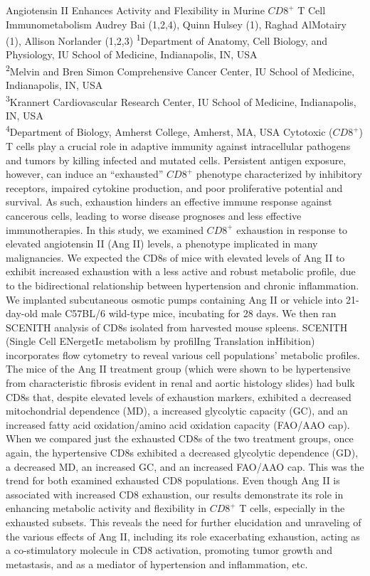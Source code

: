 \makeabstract
{
Angiotensin II Enhances Activity and Flexibility in Murine $CD8^+$ T Cell Immunometabolism
}
{
Audrey Bai (1,2,4), Quinn Hulsey (1), Raghad AlMotairy (1), Allison Norlander (1,2,3)
}
{
\textsuperscript{1}Department of Anatomy, Cell Biology, and Physiology, IU School of Medicine, Indianapolis, IN, USA\\
\textsuperscript{2}Melvin and Bren Simon Comprehensive Cancer Center, IU School of Medicine, Indianapolis, IN, USA\\
\textsuperscript{3}Krannert Cardiovascular Research Center, IU School of Medicine, Indianapolis, IN, USA\\
\textsuperscript{4}Department of Biology, Amherst College, Amherst, MA, USA
}
{
Cytotoxic ($CD8^+$) T cells play a crucial role in adaptive immunity against intracellular pathogens and tumors by killing infected and mutated cells. Persistent antigen exposure, however, can induce an “exhausted” $CD8^+$ phenotype characterized by inhibitory receptors, impaired cytokine production, and poor proliferative potential and survival. As such, exhaustion hinders an effective immune response against cancerous cells, leading to worse disease prognoses and less effective immunotherapies. In this study, we examined $CD8^+$ exhaustion in response to elevated angiotensin II (Ang II) levels, a phenotype implicated in many malignancies. We expected the CD8s of mice with elevated levels of Ang II to exhibit increased exhaustion with a less active and robust metabolic profile, due to the bidirectional relationship between hypertension and chronic inflammation.
}
{
We implanted subcutaneous osmotic pumps containing Ang II or vehicle into 21-day-old male C57BL/6 wild-type mice, incubating for 28 days. We then ran SCENITH analysis of CD8s isolated from harvested mouse spleens. SCENITH (Single Cell ENergetIc metabolism by profilIng Translation inHibition) incorporates flow cytometry to reveal various cell populations’ metabolic profiles.
}
{
The mice of the Ang II treatment group (which were shown to be hypertensive from characteristic fibrosis evident in renal and aortic histology slides) had bulk CD8s that, despite elevated levels of exhaustion markers, exhibited a decreased mitochondrial dependence (MD), a increased glycolytic capacity (GC), and an increased fatty acid oxidation/amino acid oxidation capacity (FAO/AAO cap). When we compared just the exhausted CD8s of the two treatment groups, once again, the hypertensive CD8s exhibited a decreased glycolytic dependence (GD), a decreased MD, an increased GC, and an increased FAO/AAO cap. This was the trend for both examined exhausted CD8 populations.
}
{
Even though Ang II is associated with increased CD8 exhaustion, our results demonstrate its role in enhancing metabolic activity and flexibility in $CD8^+$ T cells, especially in the exhausted subsets. This reveals the need for further elucidation and unraveling of the various effects of Ang II, including its role exacerbating exhaustion, acting as a co-stimulatory molecule in CD8 activation, promoting tumor growth and metastasis, and as a mediator of hypertension and inflammation, etc.
}

\newpage

